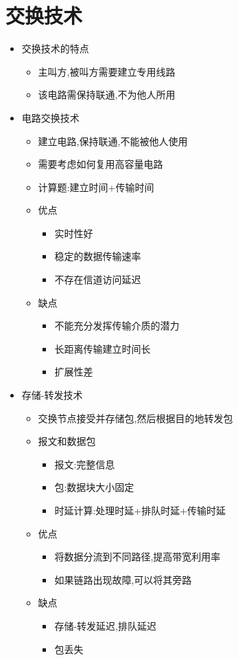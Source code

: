 \documentclass[a4paper,12pt,notitlepage]{article}
\begin{document}
\section{交换技术}
\begin{itemize}
	\item 交换技术的特点
	\begin{itemize}
		\item 主叫方,被叫方需要建立专用线路
		\item 该电路需保持联通,不为他人所用
	\end{itemize}
	\item 电路交换技术
	\begin{itemize}
		\item 建立电路,保持联通,不能被他人使用
		\item 需要考虑如何复用高容量电路
		\item 计算题:建立时间+传输时间
		\item 优点
		\begin{itemize}
			\item 实时性好
			\item 稳定的数据传输速率
			\item 不存在信道访问延迟
		\end{itemize}
		\item 缺点
		\begin{itemize}
			\item 不能充分发挥传输介质的潜力
			\item 长距离传输建立时间长
			\item 扩展性差
		\end{itemize}
	\end{itemize}
	\item 存储-转发技术
	\begin{itemize}
		\item 交换节点接受并存储包,然后根据目的地转发包
		\item 报文和数据包
		\begin{itemize}
			\item 报文:完整信息
			\item 包:数据块大小固定
			\item 时延计算:处理时延+排队时延+传输时延
		\end{itemize}
		\item 优点
		\begin{itemize}
			\item 将数据分流到不同路径,提高带宽利用率
			\item 如果链路出现故障,可以将其旁路
		\end{itemize}
		\item 缺点
		\begin{itemize}
			\item 存储-转发延迟,排队延迟
			\item 包丢失
		\end{itemize}
	\end{itemize}
\end{itemize}
\end{document}

